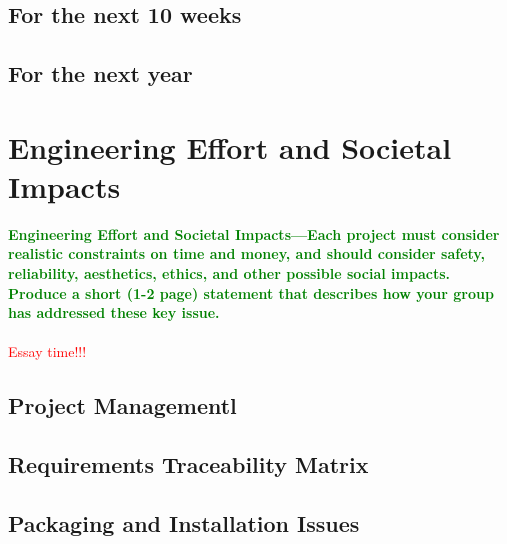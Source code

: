 \documentclass{article}
\numberwithin{equation}{section} %
\begin{document}
\subsection{For the next 10 weeks}

\subsection{For the next year}

\section{Engineering Effort and Societal Impacts}
\textcolor{green}{\bf Engineering Effort and Societal Impacts—Each project must consider realistic 
constraints on time and money, and should consider safety, reliability, aesthetics, 
ethics, and other possible social impacts. Produce a short (1-2 page) statement 
that describes how your group has addressed these key issue.} \\ \\
\textcolor{red}{Essay time!!!}

\subsection{Project Managementl}

\subsection{Requirements Traceability Matrix}

\subsection{Packaging and Installation Issues}
\end{document}
